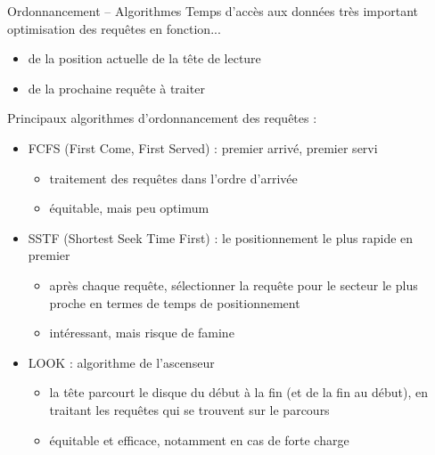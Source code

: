 \begin {frame} {Ordonnancement -- Algorithmes}
    Temps d'accès aux données très important
    \implique optimisation des requêtes en fonction...
    \begin {itemize}
	\fB
	\item de la position actuelle de la tête de lecture
	\item de la prochaine requête à traiter
    \end {itemize}

    \vspace* {2mm}

    Principaux algorithmes d'ordonnancement des requêtes :

    \begin {itemize}
	\fB
	\item FCFS (First Come, First Served) : premier arrivé, premier servi

	    \begin {itemize}
		\fC
		\item traitement des requêtes dans l'ordre d'arrivée
		\item équitable, mais peu optimum
	    \end {itemize}

	\item SSTF (Shortest Seek Time First) : le positionnement le
	    plus rapide en premier

	    \begin {itemize}
		\fC
		\item après chaque requête, sélectionner la requête
		    pour le secteur le plus proche en termes de temps
		    de positionnement
		\item intéressant, mais risque de famine

	    \end {itemize}

	\item LOOK : algorithme de l'ascenseur

	    \begin {itemize}
		\fC
		\item la tête parcourt le disque du début à la fin
		    (et de la fin au début), en traitant les requêtes
		    qui se trouvent sur le parcours
		\item équitable et efficace, notamment en cas de forte charge

	    \end {itemize}

    \end {itemize}
\end {frame}

